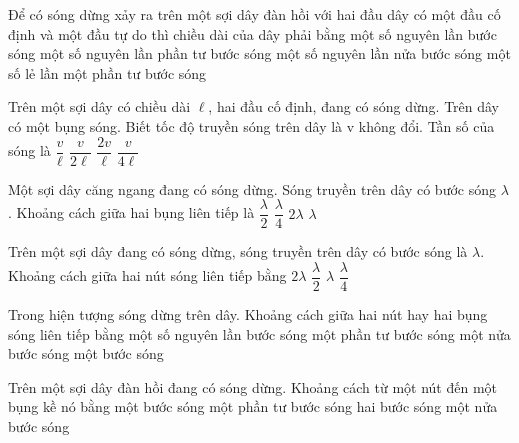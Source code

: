 \begin{ex}%
Để có sóng dừng xảy ra trên một sợi dây đàn hồi với hai đầu dây có một đầu cố định và một đầu tự do thì chiều dài của dây phải bằng
\choice
{một số nguyên lần bước sóng}
{một số nguyên lần phần tư bước sóng}
{một số nguyên lần nửa bước sóng}
{\True một số lẻ lần một phần tư bước sóng}
\end{ex} 
\begin{ex}%
Trên một sợi dây có chiều dài $\ell$, hai đầu cố định, đang có sóng dừng. Trên dây có một bụng sóng. Biết tốc độ truyền sóng trên dây là v không đổi. Tần số của sóng là
\choice
{$\dfrac{v}{\ell}$}
{\True $\dfrac{v}{2\ell}$}
{$\dfrac{2v}{\ell}$}
{$\dfrac{v}{4\ell}$}
\end{ex} 
\begin{ex}%
 Một sợi dây căng ngang đang có sóng dừng. Sóng truyền trên dây có bước sóng $\lambda$. Khoảng cách giữa hai bụng liên tiếp là
\choice
{\True $\dfrac{\lambda}{2}$}
{$\dfrac{\lambda}{4}$}
{$2\lambda $}
{$\lambda $}
\end{ex} 
\begin{ex}%
 Trên một sợi dây đang có sóng dừng, sóng truyền trên dây có bước sóng là $\lambda$. Khoảng cách giữa hai nút sóng liên tiếp bằng
\choice
{$2\lambda $}
{\True $\dfrac{\lambda}{2}$}
{$\lambda $}
{$\dfrac{\lambda}{4}$}
\end{ex} 
\begin{ex}%
Trong hiện tượng sóng dừng trên dây. Khoảng cách giữa hai nút hay hai bụng sóng liên tiếp bằng
\choice
{một số nguyên lần bước sóng}
{một phần tư bước sóng}
{\True một nửa bước sóng}
{một bước sóng}
\end{ex} 
\begin{ex}%
Trên một sợi dây đàn hồi đang có sóng dừng. Khoảng cách từ một nút đến một bụng kề nó bằng
\choice
{một bước sóng}
{\True một phần tư bước sóng}
{hai bước sóng}
{một nửa bước sóng}
\end{ex} 
